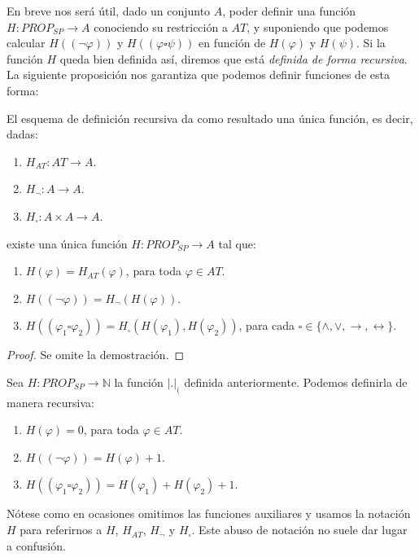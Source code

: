  En breve nos será útil, dado un conjunto $A$, poder definir una función $H: PROP_{SP} \rightarrow A$ conociendo su restricción a $AT$, y suponiendo que podemos calcular $H((\neg \varphi))$ y $H((\varphi\square\psi))$ en función de $H(\varphi)$ y $H(\psi)$.
 Si la función $H$ queda bien definida así, diremos que está \textit{definida de forma recursiva}. La siguiente proposición nos garantiza que podemos definir funciones de esta forma:
 
 \begin{prop} El esquema de definición recursiva da como resultado una única función, es decir, dadas:
\begin{enumerate}
    \item $H_{AT}: AT \rightarrow A$.
    \item $H_{\neg}: A \rightarrow A$.
    \item $H_{\square}: A \times A \rightarrow A$.
\end{enumerate}
existe una única función $H: PROP_{SP} \rightarrow A$ tal que:
\begin{enumerate}
    \item $H(\varphi) = H_{AT}(\varphi)$, para toda $\varphi \in AT$.
    \item $H((\neg \varphi)) = H_{\neg}(H(\varphi))$.
    \item $H((\varphi_1 \square \varphi_2)) = H_{\square}(H(\varphi_1), H(\varphi_2))$, para cada $\square\in \{\land, \lor, \rightarrow, \leftrightarrow\}$.
\end{enumerate}
\begin{proof}
     Se omite la demostración.
\end{proof}
\end{prop}

\begin{example} Sea $H: PROP_{SP} \rightarrow \mathbb{N}$ la función $|.|_($ definida anteriormente. Podemos definirla de manera recursiva:
\begin{enumerate}
    \item $H(\varphi) = 0$, para toda $\varphi \in AT$.
    \item $H((\neg \varphi)) = H(\varphi) + 1$.
    \item $H((\varphi_1 \square \varphi_2)) = H(\varphi_1) + H(\varphi_2) + 1$.
\end{enumerate}
Nótese como en ocasiones omitimos las funciones auxiliares y usamos la notación $H$ para referirnos a $H$, $H_{AT}$, $H_{\neg}$ y $H_{\square}$. Este abuso de notación no suele dar lugar a confusión.
\end{example}

